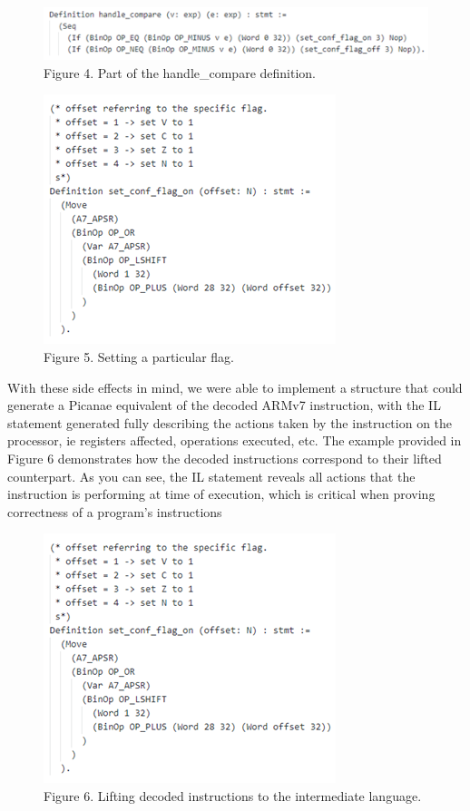 \documentclass[twocolumn]{article}
\begin{document}
\begin{figure}[H]
\centering
\includegraphics[width=\linewidth]{handle_compare_definition.png}\\
Figure 4. Part of the handle\_compare definition.


\end{figure}
\begin{figure}[H]
\centering
\includegraphics[width=.7\linewidth]{set_flag_example.png}\\
Figure 5. Setting a particular flag.

\end{figure}
With these side effects in mind, we were able to implement a structure that could generate a Picanae equivalent of the decoded ARMv7 instruction, with the IL statement generated fully describing the actions taken by the instruction on the processor, ie registers affected, operations executed, etc. The example provided in Figure 6 demonstrates how the decoded instructions correspond to their lifted counterpart. As you can see, the IL statement reveals all actions that the instruction is performing at time of execution, which is critical when proving correctness of a program's instructions
\begin{figure}[!ht]
\centering
\includegraphics[width=0.5\linewidth]{set_flag_example.png}\\
Figure 6. Lifting decoded instructions to the intermediate language.

\end{figure}
\end{document}
